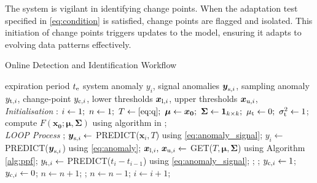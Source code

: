 The system is vigilant in identifying change points. When the adaptation test specified in \eqref{eq:condition} is satisfied, change points are flagged and isolated. This initiation of change points triggers updates to the model, ensuring it adapts to evolving data patterns effectively.

\begin{algorithm}[H]
  \caption{{Online Detection and Identification Workflow}} \label{alg:detector}
  \begin{algorithmic}[1]
    \renewcommand{\algorithmicrequire}{\textbf{Input:}}
    \renewcommand{\algorithmicensure}{\textbf{Output:}}
    \REQUIRE expiration period $t _{\text{e}}$
    \ENSURE system anomaly $y_i$, signal anomalies $\boldsymbol{y} _{\text{s}, i}$, sampling anomaly $y _{\text{t}, i}$, change-point $y _{\text{c}, i}$, lower thresholds $\boldsymbol{x} _{\text{l}, i}$, upper thresholds $\boldsymbol{x} _{\text{u}, i}$,
    \\ \textit{Initialisation} :
    \STATE $i \leftarrow 1;~ n \leftarrow 1;~ T \leftarrow \eqref{eq:q};~ \boldsymbol{\mu} \leftarrow \boldsymbol{x_0};~ \boldsymbol{\Sigma} \leftarrow \mathbf{1}_{k \times k};~ \mu _{\text{t}} \leftarrow 0;~ \sigma _{\text{t}}^2 \leftarrow 1$;
    \STATE compute $F(\boldsymbol{x_0}; \boldsymbol{\mu}, \boldsymbol{\Sigma})$ using algorithm in \cite{Genz2000};
    \\ \textit{LOOP Process}
    \LOOP
    ;
    \STATE $\boldsymbol{y} _{\text{s}, i} \leftarrow$ PREDICT($\boldsymbol{x}_i, T$) using \eqref{eq:anomaly_signal};
    \STATE $y_i \leftarrow$ PREDICT($\boldsymbol{y} _{\text{s}, i}$) using \eqref{eq:anomaly};
    \STATE $\boldsymbol{x} _{\text{l}, i}\text{, }\boldsymbol{x} _{\text{u}, i} \leftarrow$ GET($T, \boldsymbol{\mu}, \boldsymbol{\Sigma}$) using Algorithm \ref{alg:ppf};
    \STATE $y _{\text{t}, i} \leftarrow$ PREDICT($t_i - t_{i-1}$) using \eqref{eq:anomaly_signal};
    ;
    ;
    \IF {\eqref{eq:condition}}
    \STATE $y _{\text{c}, i} \leftarrow 1$;
    \ELSE
    \STATE $y _{\text{c}, i} \leftarrow 0$;
    \ENDIF
    \STATE $n \leftarrow n + 1$;
    ;
    \STATE $n \leftarrow n - 1$;
    \ENDFOR
    \ENDIF
    \STATE $i \leftarrow i + 1$;
    \ENDLOOP
  \end{algorithmic}
\end{algorithm}
